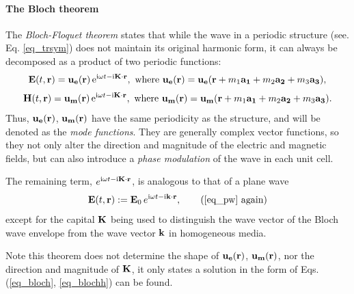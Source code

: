 \paragraph{The Bloch theorem}%
The \textit{Bloch-Floquet theorem} states that while the wave in a periodic structure (see. Eq. \ref{eq_trsym}) does not maintain its original harmonic form, it can always be decomposed as a product of two periodic functions:
\begin{equation} 
\mathbf{E}(t, {\mathbf{r}}) = \mathbf{u_e}({\mathbf{r}})\,\mathrm{e}^{{\mathrm i}\omega t - {\mathrm i}{\mathbf{K}}\cdot{\mathbf{r}}}, \text{ where } \mathbf{u_e}({\mathbf{r}}) = \mathbf{u_e}({\mathbf{r}} + m_1 \mathbf{a_1} + m_2 \mathbf{a_2} + m_3 \mathbf{a_3}),
\label{eq_bloch}\end{equation} 
\begin{equation}
\mathbf{H}(t, {\mathbf{r}}) = \mathbf{u_m}({\mathbf{r}})\,\mathrm{e}^{{\mathrm i}\omega t - {\mathrm i}{\mathbf{K}}\cdot{\mathbf{r}}}, \text{ where } \mathbf{u_m}({\mathbf{r}}) = \mathbf{u_m}({\mathbf{r}} + m_1 \mathbf{a_1} + m_2 \mathbf{a_2} + m_3 \mathbf{a_3}).
\label{eq_blochh}\end{equation} 
Thus, $\mathbf{u_e}({\mathbf{r}})$, $\mathbf{u_m}({\mathbf{r}})$ have the same periodicity as the structure, and will be denoted as the \textit{mode functions}. They are generally complex vector functions, so they not only alter the direction and magnitude of the electric and magnetic fields, but can also introduce a \textit{phase modulation} of the wave in each unit cell. 

The remaining term, $e^{{\mathrm i}\omega t - {\mathrm i}{\mathbf{K}}\cdot{\mathbf{r}}}$, is analogous to that of a plane wave
\begin{equation} \E(t, \rr) := \E_0\, e^{\ii\omega t - \ii\kk\cdot\rr}, \tag{\ref{eq_pw} \again} \end{equation}
except for the capital ${\mathbf{K}}$ being used to distinguish the wave vector of the Bloch wave envelope from the wave vector ${\mathbf{k}}$ in homogeneous media. 

Note this theorem does not determine the shape of $\mathbf{u_e}({\mathbf{r}})$, $\mathbf{u_m}({\mathbf{r}})$, nor the direction and magnitude of ${\mathbf{K}}$, it only states a solution in the form of Eqs. (\ref{eq_bloch}, \ref{eq_blochh}) can be found.

